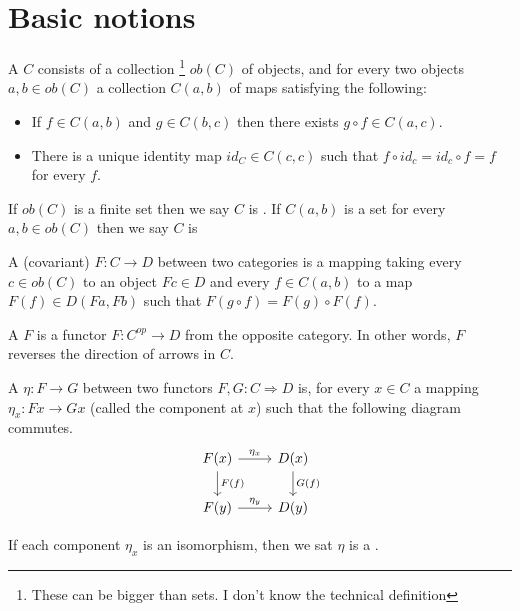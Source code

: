 \section{Basic notions}
\begin{definition}
A  $C$ consists of a collection \footnote{These can be bigger than sets. I don't know the technical definition} $ob(C)$ of objects, and for every two objects $a,b\in ob(C)$ a collection $C(a,b)$ of maps satisfying the following:
\begin{itemize}
    \item If $f\in C(a,b)$ and $g\in C(b,c)$ then there exists $g\circ f\in C(a,c)$.
    \item There is a unique identity map $id_C\in C(c,c)$ such that $f\circ id_c=id_c\circ f=f$ for every $f$.
\end{itemize}
If $ob(C)$ is a finite set then we say $C$ is . If $C(a,b)$ is a set for every $a,b\in ob(C)$ then we say $C$ is 
\end{definition}

\begin{definition}
A (covariant)  $F:C\rightarrow D$ between two categories is a mapping taking every $c\in ob(C)$ to an object $Fc\in D$ and every $f\in C(a,b)$ to a map $F(f)\in D(Fa,Fb)$ such that $F(g\circ f)=F(g)\circ F(f)$.

A  $F$ is a functor $F:C^{op}\rightarrow D$ from the opposite category. In other words, $F$ reverses the direction of arrows in $C$.
\end{definition}

\begin{definition}
A  $\eta:F\rightarrow G$ between two functors $F,G:C\Rightarrow D$ is, for every $x\in C$ a mapping $\eta_x:Fx\rightarrow Gx$ (called the component at $x$) such that the following diagram commutes.
\[\begin{tikzcd}
F(x) \arrow[d, "F(f)"] \arrow[r, "\eta_x"] & D(x) \arrow[d, "G(f)"] \\
F(y) \arrow[r, "\eta_y"]                   & D(y)                  
\end{tikzcd}\]

If each component $\eta_x$ is an isomorphism, then we sat $\eta$ is a .
\end{definition}

